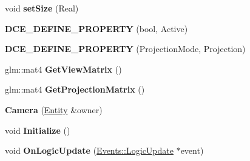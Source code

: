 \begin{DoxyCompactItemize}
\item 
\hypertarget{classDCEngine_1_1Components_1_1Camera_ad668eb9422ed01c2f56ec63bccecaeaa}{void {\bfseries set\-Size} (Real)}\label{classDCEngine_1_1Components_1_1Camera_ad668eb9422ed01c2f56ec63bccecaeaa}

\item 
\hypertarget{classDCEngine_1_1Components_1_1Camera_af93426305069908f684de8bde576dd17}{{\bfseries D\-C\-E\-\_\-\-D\-E\-F\-I\-N\-E\-\_\-\-P\-R\-O\-P\-E\-R\-T\-Y} (bool, Active)}\label{classDCEngine_1_1Components_1_1Camera_af93426305069908f684de8bde576dd17}

\item 
\hypertarget{classDCEngine_1_1Components_1_1Camera_abec61d44be812cf153c7156666f6a430}{{\bfseries D\-C\-E\-\_\-\-D\-E\-F\-I\-N\-E\-\_\-\-P\-R\-O\-P\-E\-R\-T\-Y} (Projection\-Mode, Projection)}\label{classDCEngine_1_1Components_1_1Camera_abec61d44be812cf153c7156666f6a430}

\item 
\hypertarget{classDCEngine_1_1Components_1_1Camera_ad09d6ebd5e78940ad608e7fe7cf9d935}{glm\-::mat4 {\bfseries Get\-View\-Matrix} ()}\label{classDCEngine_1_1Components_1_1Camera_ad09d6ebd5e78940ad608e7fe7cf9d935}

\item 
\hypertarget{classDCEngine_1_1Components_1_1Camera_a2cf5053654219b9922c7b5d7e9659475}{glm\-::mat4 {\bfseries Get\-Projection\-Matrix} ()}\label{classDCEngine_1_1Components_1_1Camera_a2cf5053654219b9922c7b5d7e9659475}

\item 
\hypertarget{classDCEngine_1_1Components_1_1Camera_aea7f55eb0839fcf5ab3e916b0a322cc5}{{\bfseries Camera} (\hyperlink{classDCEngine_1_1Entity}{Entity} \&owner)}\label{classDCEngine_1_1Components_1_1Camera_aea7f55eb0839fcf5ab3e916b0a322cc5}

\item 
\hypertarget{classDCEngine_1_1Components_1_1Camera_a0defeac595a9c8a5d4f9b8a56dd9415d}{void {\bfseries Initialize} ()}\label{classDCEngine_1_1Components_1_1Camera_a0defeac595a9c8a5d4f9b8a56dd9415d}

\item 
\hypertarget{classDCEngine_1_1Components_1_1Camera_ab108d1e0071ec1c3a9483cbb7f1731e5}{void {\bfseries On\-Logic\-Update} (\hyperlink{classDCEngine_1_1Events_1_1LogicUpdate}{Events\-::\-Logic\-Update} $\ast$event)}\label{classDCEngine_1_1Components_1_1Camera_ab108d1e0071ec1c3a9483cbb7f1731e5}

\end{DoxyCompactItemize}
